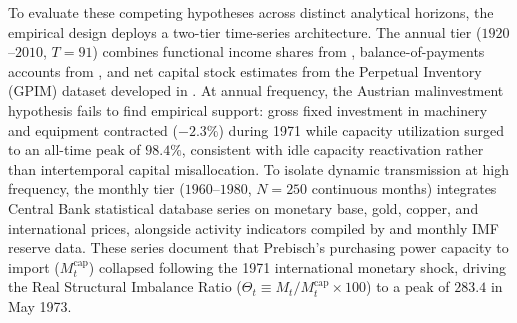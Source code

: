 To evaluate these competing hypotheses across distinct analytical horizons, the empirical design deploys a two-tier time-series architecture. The annual tier ($1920$--$2010$, $T=91$) combines functional income shares from \citet{Astorga2023}, balance-of-payments accounts from \citet{NievasPiketty2025}, and net capital stock estimates from the Perpetual Inventory (GPIM) dataset developed in \citet{Polanco2026}. At annual frequency, the Austrian malinvestment hypothesis \citep{EspinosaVejar2025} fails to find empirical support: gross fixed investment in machinery and equipment contracted ($-2.3\%$) during 1971 while capacity utilization surged to an all-time peak of $98.4\%$, consistent with idle capacity reactivation rather than intertemporal capital misallocation. To isolate dynamic transmission at high frequency, the monthly tier ($1960$--$1980$, $N=250$ continuous months) integrates Central Bank statistical database series on monetary base, gold, copper, and international prices, alongside activity indicators compiled by \citet{DiazBahamonde2023} and monthly IMF reserve data. These series document that Prebisch's purchasing power capacity to import ($M^{\text{cap}}_t$) collapsed following the 1971 international monetary shock, driving the Real Structural Imbalance Ratio ($\Theta_t \equiv M_t / M^{\text{cap}}_t \times 100$) to a peak of $283.4$ in May 1973.

